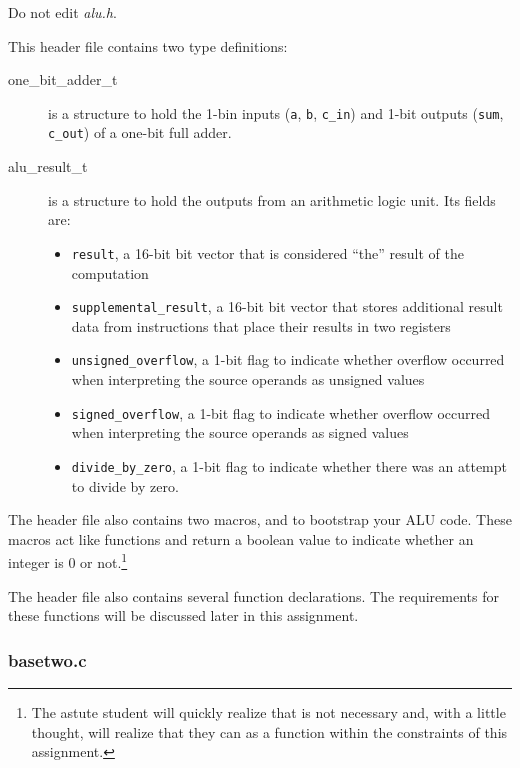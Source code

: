 Do not edit \textit{alu.h}.

This header file contains two type definitions:
\begin{description}
    \item[one\_bit\_adder\_t] is a structure to hold the 1-bin inputs (\lstinline{a}, \lstinline{b}, \lstinline{c_in}) and 1-bit outputs (\lstinline{sum}, \lstinline{c_out}) of a one-bit full adder.
    \item[alu\_result\_t] is a structure to hold the outputs from an arithmetic logic unit.
        Its fields are:
        \begin{itemize}
            \item \lstinline{result}, a 16-bit bit vector that is considered ``the'' result of the computation
            \item \lstinline{supplemental_result}, a 16-bit bit vector that stores additional result data from instructions that place their results in two registers
            \item \lstinline{unsigned_overflow}, a 1-bit flag to indicate whether overflow occurred when interpreting the source operands as unsigned values
            \item \lstinline{signed_overflow}, a 1-bit flag to indicate whether overflow occurred when interpreting the source operands as signed values
            \item \lstinline{divide_by_zero}, a 1-bit flag to indicate whether there was an attempt to divide by zero.
        \end{itemize}
\end{description}

The header file also contains two macros,  and  to bootstrap your ALU code.
These macros act like functions and return a boolean value to indicate whether an integer is 0 or not.\footnote{
    The astute student will quickly realize that  is not necessary and, with a little thought, will realize that they can  as a function within the constraints of this assignment.}

The header file also contains several function declarations.
The requirements for these functions will be discussed later in this assignment.

\subsubsection{basetwo.c}

